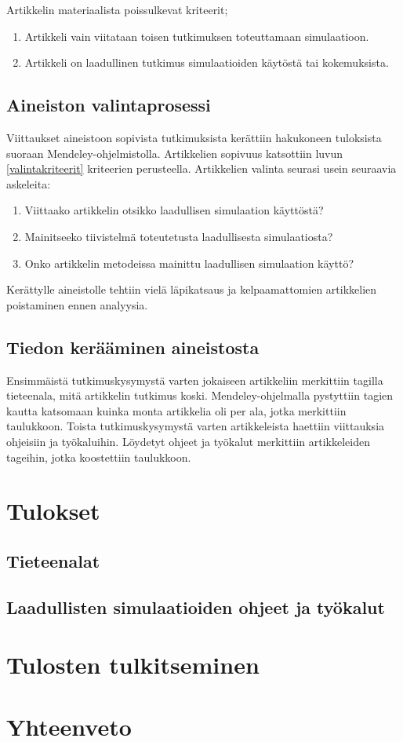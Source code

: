\documentclass[utf8]{gradu3}
\begin{document}
Artikkelin materiaalista poissulkevat kriteerit;
\begin{enumerate}
    \item Artikkeli vain viitataan toisen tutkimuksen toteuttamaan simulaatioon.
    \item Artikkeli on laadullinen tutkimus simulaatioiden käytöstä tai kokemuksista.
\end{enumerate}

\section{Aineiston valintaprosessi} \label{valintaprosessi}
Viittaukset aineistoon sopivista tutkimuksista kerättiin hakukoneen tuloksista suoraan Mendeley-ohjelmistolla. Artikkelien sopivuus katsottiin luvun \ref{valintakriteerit} kriteerien perusteella. Artikkelien valinta seurasi usein seuraavia askeleita:

\begin{enumerate}
    \item Viittaako artikkelin otsikko laadullisen simulaation käyttöstä?
    \item Mainitseeko tiivistelmä toteutetusta laadullisesta simulaatiosta?
    \item Onko artikkelin metodeissa mainittu laadullisen simulaation käyttö?
\end{enumerate}

Kerättylle aineistolle tehtiin vielä läpikatsaus ja kelpaamattomien artikkelien poistaminen ennen analyysia.

\section{Tiedon kerääminen aineistosta} \label{aineiston analysointi}
Ensimmäistä tutkimuskysymystä varten jokaiseen artikkeliin merkittiin tagilla tieteenala, mitä artikkelin tutkimus koski. Mendeley-ohjelmalla pystyttiin tagien kautta katsomaan kuinka monta artikkelia oli per ala, jotka merkittiin taulukkoon. Toista tutkimuskysymystä varten artikkeleista haettiin viittauksia ohjeisiin ja työkaluihin. Löydetyt ohjeet ja työkalut merkittiin artikkeleiden tageihin, jotka koostettiin taulukkoon.


\chapter{Tulokset}

\section{Tieteenalat}

\section{Laadullisten simulaatioiden ohjeet ja työkalut}


\chapter{Tulosten tulkitseminen}


\chapter{Yhteenveto}


\printbibliography
\end{document}
